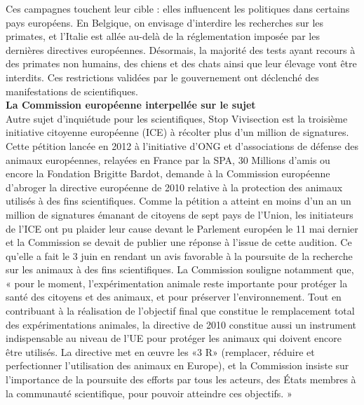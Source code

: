\documentclass[8pt]{article}
\begin{document}
Ces campagnes touchent leur cible : elles influencent les politiques dans certains pays européens. En Belgique, on envisage d’interdire les recherches sur les primates, et l’Italie est allée au-delà de la réglementation imposée par les dernières directives européennes. Désormais, la majorité des tests ayant recours à des primates non humains, des chiens et des chats ainsi que leur élevage vont être interdits. Ces restrictions validées par le gouvernement ont déclenché des manifestations de scientifiques.\\

\textbf{La Commission européenne interpellée sur le sujet}\\

Autre sujet d’inquiétude pour les scientifiques, Stop Vivisection est la troisième initiative citoyenne européenne (ICE) à récolter plus d’un million de signatures. Cette pétition lancée en 2012 à l’initiative d’ONG et d’associations de défense des animaux européennes, relayées en France par la SPA, 30 Millions d’amis ou encore la Fondation Brigitte Bardot, demande à la Commission européenne d’abroger la directive européenne de 2010 relative à la protection des animaux utilisés à des fins scientifiques. Comme la pétition a atteint en moins d’un an un million de signatures émanant de citoyens de sept pays de l’Union, les initiateurs de l’ICE ont pu plaider leur cause devant le Parlement européen le 11 mai dernier et la Commission se devait de publier une réponse à l'issue de cette audition. Ce qu'elle a fait le 3 juin en rendant un avis favorable à la poursuite de la recherche sur les animaux à des fins scientifiques. La Commission souligne notamment que, « pour le moment, l’expérimentation animale reste importante pour protéger la santé des citoyens et des animaux, et pour préserver l’environnement. Tout en contribuant à la réalisation de l’objectif final que constitue le remplacement total des expérimentations animales, la  directive de 2010  constitue aussi un instrument indispensable au niveau de l’UE pour protéger les animaux qui doivent encore être utilisés. La directive met en œuvre les «3 R» (remplacer, réduire et perfectionner l’utilisation des animaux en Europe), et la Commission insiste sur l’importance de la poursuite des efforts par tous les acteurs, des États membres à la communauté scientifique, pour pouvoir  atteindre ces objectifs. »\\
\end{document}
